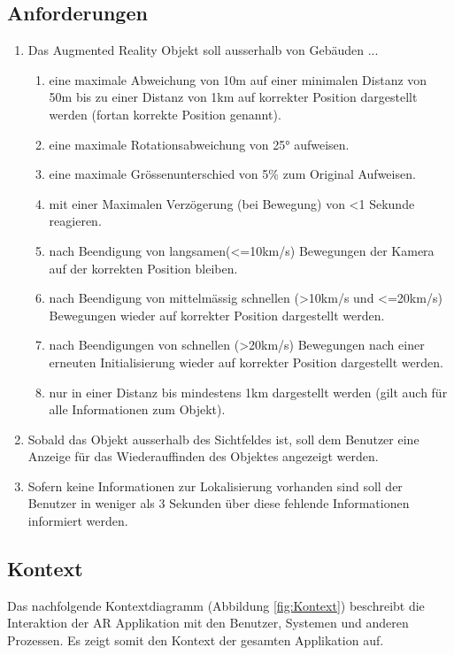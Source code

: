 \documentclass[a4paper]{scrreprt}
\begin{document}
\subsection{Anforderungen}
\label{ch:Anforderungen}
\begin{enumerate}
	\item Das Augmented Reality Objekt soll ausserhalb von Gebäuden ...
	\begin{enumerate}[label*=\arabic*.]
		\item eine maximale Abweichung von 10m auf einer minimalen Distanz von 50m bis zu einer Distanz von 1km auf korrekter Position dargestellt werden (fortan korrekte Position genannt).
		\item eine maximale Rotationsabweichung von \ang{25} aufweisen.
		\item eine maximale Grössenunterschied von 5\% zum Original Aufweisen.
		\item mit einer Maximalen Verzögerung (bei Bewegung) von <1 Sekunde reagieren.
		\item nach Beendigung von langsamen(<=10km/s) Bewegungen der Kamera auf der korrekten Position bleiben.
		\item nach Beendigung von mittelmässig schnellen (>10km/s und <=20km/s) Bewegungen wieder auf korrekter Position dargestellt werden.
		\item nach Beendigungen von schnellen (>20km/s) Bewegungen nach einer erneuten Initialisierung wieder auf korrekter Position dargestellt werden.
		\item nur in einer Distanz bis mindestens 1km dargestellt werden (gilt auch für alle Informationen zum Objekt).
	\end{enumerate}
	\item Sobald das Objekt ausserhalb des Sichtfeldes ist, soll dem Benutzer eine Anzeige für das Wiederauffinden des Objektes angezeigt werden.
	\item Sofern keine Informationen zur Lokalisierung vorhanden sind soll der Benutzer in weniger als 3 Sekunden über diese fehlende Informationen informiert werden.
\end{enumerate}

\subsection{Kontext}
Das nachfolgende Kontextdiagramm (Abbildung \ref{fig:Kontext}) beschreibt die Interaktion der AR Applikation mit den Benutzer, Systemen und anderen Prozessen. Es zeigt somit den Kontext der gesamten Applikation auf.
\end{document}
